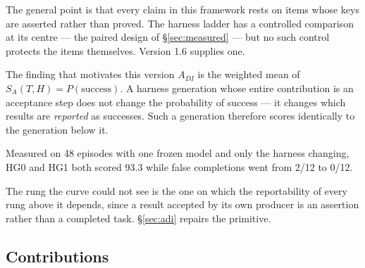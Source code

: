\documentclass[11pt]{article}
\theoremstyle{definition}
\newcommand{\SA}{\ensuremath{S_A(T,H)}}
\begin{document}
The general point is that every claim in this framework rests on items whose keys are asserted rather than proved. The harness ladder has a controlled comparison at its centre --- the paired design of \S\ref{sec:measured} --- but no such control protects the items themselves. Version 1.6 supplies one.

\begin{cautionbox}{The finding that motivates this version}
$A_{DI}$ is the weighted mean of $\SA{} = P(\text{success})$. A harness generation whose entire contribution is an acceptance step does not change the probability of success --- it changes which results are \emph{reported} as successes. Such a generation therefore scores identically to the generation below it.

Measured on 48 episodes with one frozen model and only the harness changing, HG0 and HG1 both scored 93.3 while false completions went from 2/12 to 0/12.

The rung the curve could not see is the one on which the reportability of every rung above it depends, since a result accepted by its own producer is an assertion rather than a completed task. \S\ref{sec:adi} repairs the primitive.
\end{cautionbox}

\subsection{Contributions}
\end{document}
